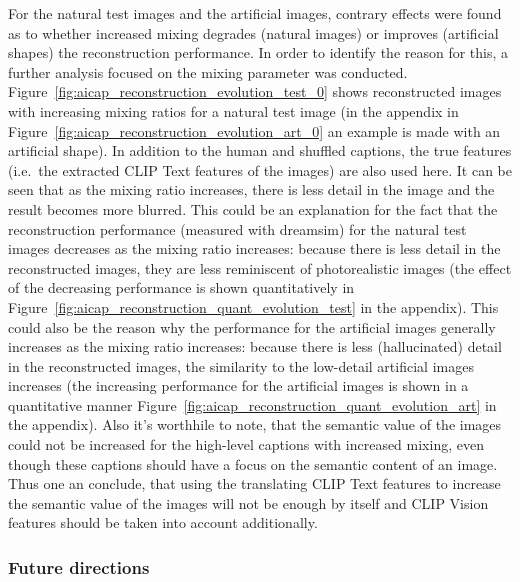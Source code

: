 For the natural test images and the artificial images, contrary effects were found as to whether increased mixing degrades (natural images) or improves (artificial shapes) the reconstruction performance. In order to identify the reason for this, a further analysis focused on the mixing parameter was conducted. Figure~\ref{fig:aicap_reconstruction_evolution_test_0} shows reconstructed images with increasing mixing ratios for a natural test image (in the appendix in Figure~\ref{fig:aicap_reconstruction_evolution_art_0} an example is made with an artificial shape). In addition to the human and shuffled captions, the true features (i.e.\ the extracted CLIP Text features of the images) are also used here. It can be seen that as the mixing ratio increases, there is less detail in the image and the result becomes more blurred. This could be an explanation for the fact that the reconstruction performance (measured with dreamsim) for the natural test images decreases as the mixing ratio increases: because there is less detail in the reconstructed images, they are less reminiscent of photorealistic images (the effect of the decreasing performance is shown quantitatively in Figure~\ref{fig:aicap_reconstruction_quant_evolution_test} in the appendix). This could also be the reason why the performance for the artificial images generally increases as the mixing ratio increases: because there is less (hallucinated) detail in the reconstructed images, the similarity to the low-detail artificial images increases (the increasing performance for the artificial images is shown in a quantitative manner Figure~\ref{fig:aicap_reconstruction_quant_evolution_art} in the appendix). Also it's worthhile to note, that the semantic value of the images could not be increased for the high-level captions with increased mixing, even though these captions should have a focus on the semantic content of an image. Thus one an conclude, that using the translating CLIP Text features to increase the semantic value of the images will not be enough by itself and CLIP Vision features should be taken into account additionally.

\subsubsection{Future directions}

